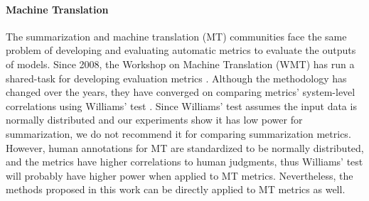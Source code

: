 \paragraph{Machine Translation}
The summarization and machine translation (MT) communities face the same problem of developing and evaluating automatic metrics to evaluate the outputs of models.
Since 2008, the Workshop on Machine Translation (WMT) has run a shared-task for developing evaluation metrics \citep[among others]{MWFMB20}.
Although the methodology has changed over the years, they have converged on comparing metrics' system-level correlations using Williams' test \citep{GrahamBa14}.
Since Williams' test assumes the input data is normally distributed and our experiments show it has low power for summarization, we do not recommend it for comparing summarization metrics.
However, human annotations for MT are standardized to be normally distributed, and the metrics have higher correlations to human judgments, thus Williams' test will probably have higher power when applied to MT metrics.
Nevertheless, the methods proposed in this work can be directly applied to MT metrics as well.




